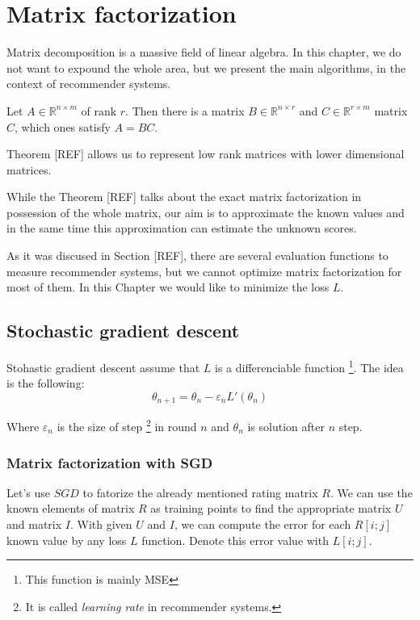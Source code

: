 
\chapter{Matrix factorization}
Matrix decomposition is a massive field of linear algebra. In this chapter, we do
not want to expound the whole area, but we present the main algorithms, in the
context of recommender systems.

\begin{theo}
  Let $A\in \mathbb{R}^{n\times m}$ of rank $r$. Then there is a matrix
  $B\in \mathbb{R}^{n\times r}$ and $C\in \mathbb{R}^{r\times m}$
  matrix $C$, which ones satisfy $A=BC$.
\end{theo}

Theorem [REF] allows us to represent low rank matrices with lower dimensional
matrices.

While the Theorem [REF] talks about the exact matrix factorization in possession
of the whole matrix, our aim is to approximate the known values and in the same
time this approximation can estimate the unknown scores.

As it was discused in Section [REF], there are several evaluation functions to
measure recommender systems, but we cannot optimize matrix factorization for most
of them. In this Chapter we would like to minimize the loss $L$.

\section{Stochastic gradient descent}
Stohastic gradient descent assume that $L$ is a differenciable function \footnote{
This function is mainly MSE}. The idea is the following:
\[ \theta_{n+1}=\theta_n - \varepsilon_n L'(\theta_n) \]

Where $\varepsilon_n$ is the size of step \footnote{It is called \emph{learning rate}
  in recommender systems.} in round $n$ and $\theta_{n}$ is solution after $n$ step.

\subsection{Matrix factorization with SGD}
Let's use $SGD$ to fatorize the already mentioned rating matrix $R$. We can use the
known elements of matrix $R$ as training points to find the appropriate matrix $U$ and
matrix $I$. With given $U$ and $I$, we can compute the error for each $R[i;j]$ known
value by any loss $L$ function. Denote this error value with $L[i;j]$.

